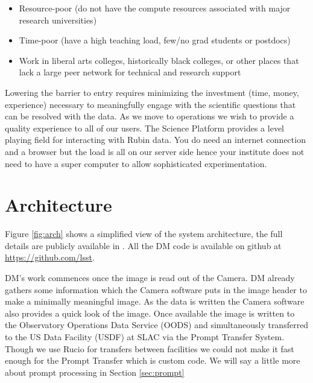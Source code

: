 \documentclass[11pt,twoside]{article}
\begin{document}
\begin{itemize}
\item Resource-poor (do not have the compute resources associated with major research universities)
\item Time-poor (have a high teaching load, few/no grad students or postdocs)
\item Work in liberal arts colleges, historically black colleges, or other places that lack a large peer network for technical and research support

\end{itemize}

Lowering the barrier to entry  requires minimizing the investment (time, money, experience) necessary to meaningfully engage with the scientific questions that can be resolved with the data.
As we move to operations we wish to provide a quality experience to all of our users.
The Science Platform provides a level playing field for interacting with Rubin data.
You do need an internet connection and a browser but the load is all on our server side hence your institute does not need to have a super computer to allow sophisticated experimentation.


\section{Architecture}
 Figure \ref{fig:arch} shows a simplified view of the system architecture, the full details are publicly available in \citep{LDM-148}. All the DM code is available on github at \url{https://github.com/lsst}.


\begin{centering}
\end{centering}

DM's work commences once the image is read out of the Camera. DM already gathers some information which the Camera software puts in the image header to make a minimally meaningful image.
As the data is written the Camera software also provides a quick look  of the image.
Once available the image is written to the Observatory Operations Data Service (OODS) and simultaneously transferred to the US Data Facility (USDF) at SLAC via the Prompt Transfer System. Though we use Rucio for transfers between facilities we could not make it fast enough for the Prompt Transfer which is custom code.
We will say a little more about prompt processing in Section \ref{sec:prompt}
\end{document}

